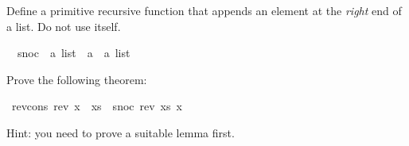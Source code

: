 %
\begin{isabellebody}%
\def\isabellecontext{Snoc}%
\isamarkupfalse%
%
\isamarkuptrue%
%
\begin{isamarkuptext}%
Define a primitive recursive function  that appends an element
at the \emph{right} end of a list. Do not use \isa{{\isacharat}} itself.%
\end{isamarkuptext}%
\isamarkuptrue%
\isanewline
\ \ snoc\ {\isacharcolon}{\isacharcolon}\ {\isachardoublequote}{\isacharprime}a\ list\ {\isacharequal}{\isachargreater}\ {\isacharprime}a\ {\isacharequal}{\isachargreater}\ {\isacharprime}a\ list{\isachardoublequote}\isamarkupfalse%
%
\begin{isamarkuptext}%
Prove the following theorem:%
\end{isamarkuptext}%
\isamarkuptrue%
\ rev{\isacharunderscore}cons{\isacharcolon}\ {\isachardoublequote}rev\ {\isacharparenleft}x\ {\isacharhash}\ xs{\isacharparenright}\ {\isacharequal}\ snoc\ {\isacharparenleft}rev\ xs{\isacharparenright}\ x{\isachardoublequote}\isamarkupfalse%
\isamarkupfalse%
%
\begin{isamarkuptext}%
Hint: you need to prove a suitable lemma first.%
\end{isamarkuptext}%
\isamarkuptrue%
\isamarkupfalse%
\end{isabellebody}%

